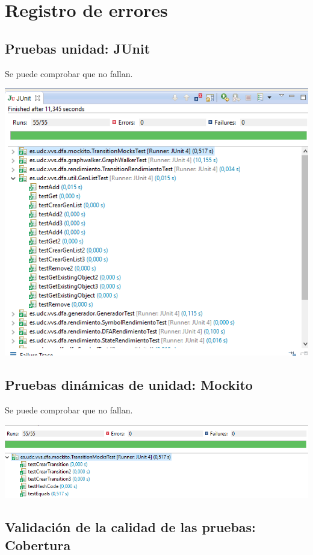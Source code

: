 \documentclass[DIV=calc,paper=a4,fontsize=11pt,onecolumn]{scrartcl} %
\begin{document}
	
	\section{Registro de errores}
	\subsection{Pruebas unidad: JUnit}
	Se puede comprobar que no fallan.
	
	\includegraphics[width=15cm]{Imagenes/junit.png}
		
	\subsection{Pruebas dinámicas de unidad: Mockito}
	Se puede comprobar que no fallan.
	
	\includegraphics[width=15cm]{Imagenes/mockito.png}
		
	\subsection{Validación de la calidad de las pruebas: Cobertura}
	
\end{document}
